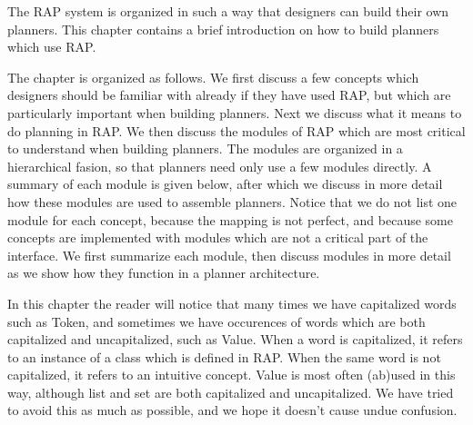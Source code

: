 

The RAP system is organized in such a way that designers can build their
own planners.  This chapter contains a brief introduction
on how to build planners which use RAP. 


The chapter is organized as follows.  We first discuss a few concepts
which designers should be familiar with already if they have used RAP,
but which are particularly important when building planners.  
Next we discuss what it means to do planning in RAP.  
We then
discuss the modules of RAP which are most critical to understand when
building planners.  The modules are organized in a hierarchical
fasion, so that planners need only use a few modules directly.  A
summary of each module is given below, after which we discuss in more
detail how these modules are used to assemble planners.  Notice that
we do not list one module for each concept, because the mapping is
not perfect, and because some concepts are implemented with modules
which are not a critical part of the interface.  We first summarize
each module, then discuss modules in more detail as we show how they
function in a planner architecture.

In this chapter the reader will notice that many times we have capitalized
words such as Token, and sometimes we have occurences of words which
are both capitalized and uncapitalized, such as Value.  When a word is
capitalized, it refers to an instance of a class which is defined in
RAP.  When the same word is not capitalized, it refers to an intuitive
concept.  Value is most often (ab)used in this way, although list and
set are both capitalized and uncapitalized.  We have tried to avoid this as much
as possible, and we hope it doesn't cause undue confusion.  


